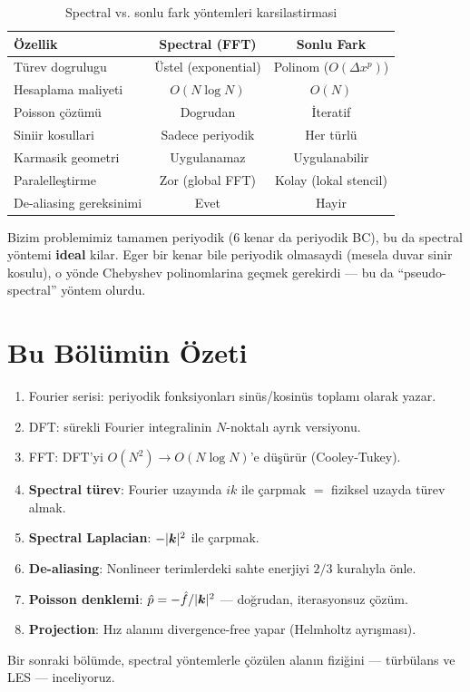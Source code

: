 \begin{table}[H]
\centering
\caption{Spectral vs. sonlu fark yöntemleri karsilastirmasi}
\label{tab:spectral_vs_fd}
\begin{tabular}{lcc}
\toprule
\textbf{Özellik} & \textbf{Spectral (FFT)} & \textbf{Sonlu Fark} \\
\midrule
Türev dogrulugu & Üstel (exponential) & Polinom ($O(\Delta x^p)$) \\
Hesaplama maliyeti & $O(N\log N)$ & $O(N)$ \\
Poisson çözümü & Dogrudan & İteratif \\
Siniir kosullari & Sadece periyodik & Her türlü \\
Karmasik geometri & Uygulanamaz & Uygulanabilir \\
Paralelleştirme & Zor (global FFT) & Kolay (lokal stencil) \\
De-aliasing gereksinimi & Evet & Hayir \\
\bottomrule
\end{tabular}
\end{table}

Bizim problemimiz tamamen periyodik (6 kenar da periyodik BC), bu da spectral yöntemi \textbf{ideal} kilar. Eger bir kenar bile periyodik olmasaydi (mesela duvar sinir kosulu), o yönde Chebyshev polinomlarina geçmek gerekirdi --- bu da ``pseudo-spectral'' yöntem olurdu.


\section{Bu Bölümün Özeti}

\begin{enumerate}
\item Fourier serisi: periyodik fonksiyonları sinüs/kosinüs toplamı olarak yazar.
\item DFT: sürekli Fourier integralinin $N$-noktalı ayrık versiyonu.
\item FFT: DFT'yi $O(N^2) \to O(N\log N)$'e düşürür (Cooley-Tukey).
\item \textbf{Spectral türev}: Fourier uzayında $ik$ ile çarpmak $=$ fiziksel uzayda türev almak.
\item \textbf{Spectral Laplacian}: $-|\bm{k}|^2$ ile çarpmak.
\item \textbf{De-aliasing}: Nonlineer terimlerdeki sahte enerjiyi $2/3$ kuralıyla önle.
\item \textbf{Poisson denklemi}: $\hat{p} = -\hat{f}/|\bm{k}|^2$ --- doğrudan, iterasyonsuz çözüm.
\item \textbf{Projection}: Hız alanını divergence-free yapar (Helmholtz ayrışması).
\end{enumerate}

Bir sonraki bölümde, spectral yöntemlerle çözülen alanın fiziğini --- türbülans ve LES --- inceliyoruz.
